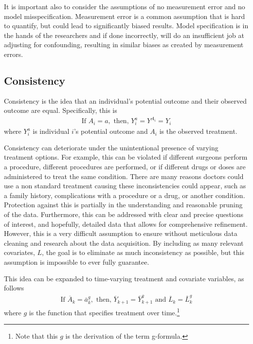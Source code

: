 It is important also to consider the assumptions of no measurement error and no model misspecification.  Measurement error is a common assumption that is hard to quantify, but could lead to significantly biased results.  Model specification is in the hands of the researchers and if done incorrectly, will do an insufficient job at adjusting for confounding, resulting in similar biases as created by measurement errors.  
 
\subsection{Consistency} 
Consistency is the idea that an individual's potential outcome and their observed outcome are equal\cite{cole2009consistency, hernan_robins_2016}.  Specifically, this is 
\begin{align} 
\text{If  } A_i = a, \text{     then,    } Y_i^a = Y^{A_i} = Y_i 
\end{align} 
where $Y_i^a$ is individual $i$'s potential outcome and $A_i$ is the observed treatment.  

Consistency can deteriorate under the unintentional presence of varying treatment options.  For example, this can be violated if different surgeons perform a procedure, different procedures are performed, or if different drugs or doses are administered to treat the same condition.  There are many reasons doctors could use a non standard treatment causing these inconsistencies could appear, such as a family history, complications with a procedure or a drug, or another condition.  Protection against this is partially in the understanding and reasonable pruning of the data.  Furthermore, this can be addressed with clear and precise questions of interest, and hopefully, detailed data that allows for comprehensive refinement.  However, this is a very difficult assumption to ensure without meticulous data cleaning and research about the data acquisition.  By including as many relevant covariates, $L$, the goal is to eliminate as much inconsistency as possible, but this assumption is impossible to ever fully guarantee.  

This idea can be expanded to time-varying treatment and covariate variables, as follows 
\begin{align} 
\text{If } \overline{A}_k = \bar{a}^g _k, \text{ then, } \overline{Y}_{k+1} =  \bar{Y}^g_{k+1} \text{ and } \overline{L}_k = \bar{L}^g_k
\end{align}
where $g$ is the function that specifies treatment over time.\footnote{Note that this $g$ is the derivation of the term g-formula.}

